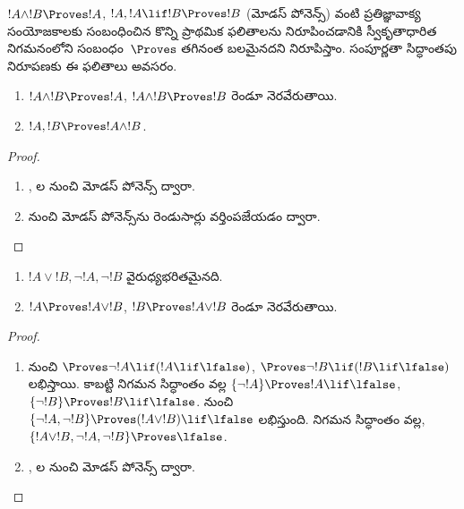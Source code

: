 \documentclass[../../../include/open-logic-section]{subfiles}
\begin{document}
      {}
      {}


\begin{explain}
  $!A \land !B \Proves !A$, $!A, !A \lif !B \Proves !B$ (మోడస్
  పోనెన్స్) వంటి ప్రతిజ్ఞావాక్య సంయోజకాలకు సంబంధించిన కొన్ని ప్రాథమిక
  ఫలితాలను నిరూపించడానికి స్వీకృతాధారిత నిగమనంలోని
   సంబంధం~$\Proves$ తగినంత బలమైనదని నిరూపిస్తాం.
  సంపూర్ణతా సిద్ధాంతపు నిరూపణకు ఈ ఫలితాలు అవసరం.
\end{explain}

\begin{prop}
  \begin{enumerate}
  \item {} $!A \land !B \Proves
    !A$, $!A \land !B \Proves !B$ రెండూ నెరవేరుతాయి.
  \item {} $!A, !B \Proves !A \land !B$.
  \end{enumerate}
\end{prop}

\begin{proof}
  \begin{enumerate}
    \item {}, ల నుంచి మోడస్
      పోనెన్స్ ద్వారా.
  \item {} నుంచి మోడస్ పోనెన్స్‌ను రెండుసార్లు
    వర్తింపజేయడం ద్వారా.
  \end{enumerate}
\end{proof}

\begin{prop}
  \begin{enumerate}
  \item $!A \lor !B, \lnot !A, \lnot !B$ వైరుధ్యభరితమైనది.
  \item $!A \Proves !A \lor !B$, $!B \Proves !A \lor !B$ రెండూ నెరవేరుతాయి.
  \end{enumerate}
\end{prop}

\begin{proof}
  \begin{enumerate}
  \item {} నుంచి $\Proves \lnot !A \lif (!A
    \lif \lfalse)$, $\Proves \lnot !B \lif (!B \lif \lfalse)$
    లభిస్తాయి.
    కాబట్టి నిగమన సిద్ధాంతం వల్ల $\{\lnot !A\} \Proves
    !A \lif \lfalse$, $\{\lnot !B\} \Proves !B \lif \lfalse$.
     నుంచి $\{\lnot !A, \lnot !B\} \Proves
    (!A \lor !B) \lif \lfalse$ లభిస్తుంది. నిగమన సిద్ధాంతం వల్ల,
    $\{!A \lor !B, \lnot !A, \lnot !B\} \Proves \lfalse$.
  \item {}, ల నుంచి మోడస్
    పోనెన్స్ ద్వారా.
  \end{enumerate}
\end{proof}
\end{document}

